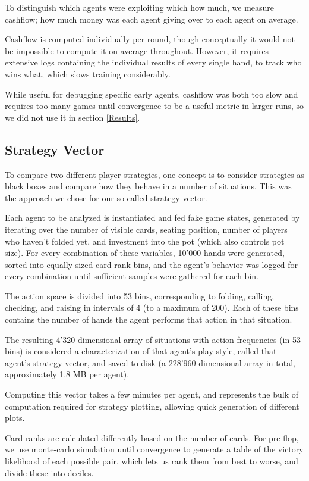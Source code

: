 To distinguish which agents were exploiting which how much, we measure cashflow; how much money was each agent giving over to each agent on average.

Cashflow is computed individually per round, though conceptually it would not be impossible to compute it on average throughout. However, it requires extensive logs containing the individual results of every single hand, to track who wins what, which slows training considerably.

While useful for debugging specific early agents, cashflow was both too slow and requires too many games until convergence to be a useful metric in larger runs, so we did not use it in section \ref{Results}.

\subsection{Strategy Vector}
\label{StrategyVectorComputation}
To compare two different player strategies, one concept is to consider strategies as black boxes and compare how they behave in a number of situations. This was the approach we chose for our so-called strategy vector.

Each agent to be analyzed is instantiated and fed fake game states, generated by iterating over the number of visible cards, seating position, number of players who haven't folded yet, and investment into the pot (which also controls pot size). For every combination of these variables, 10'000 hands were generated, sorted into equally-sized card rank bins, and the agent's behavior was logged for every combination until sufficient samples were gathered for each bin.

The action space is divided into 53 bins, corresponding to folding, calling, checking, and raising in intervals of 4 (to a maximum of 200). Each of these bins contains the number of hands the agent performs that action in that situation.

The resulting 4'320-dimensional array of situations with action frequencies (in 53 bins) is considered a characterization of that agent's play-style, called that agent's strategy vector, and saved to disk (a 228'960-dimensional array in total, approximately 1.8 MB per agent).

Computing this vector takes a few minutes per agent, and represents the bulk of computation required for strategy plotting, allowing quick generation of different plots.

Card ranks are calculated differently based on the number of cards. For pre-flop, we use monte-carlo simulation until convergence to generate a table of the victory likelihood of each possible pair, which lets us rank them from best to worse, and divide these into deciles.

